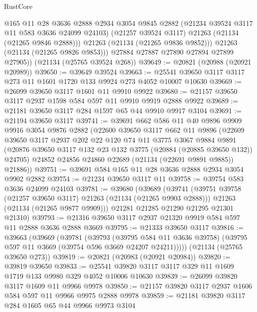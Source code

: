 \begin{lexlean}{RustCore}
\begin{coremodule}
              @165
              @11
              @28
              @3636
              @2888
              @2934
              @3054
              @9845
              @2882
              (@21234 @39524 @3117 @11 @583 @3636 @24099 @24103)
              (@21257 @39524 @3117)
              @21263
              (@21134 (@21265 @9846 @2888)))
            @21263
            (@21134 (@21265 @9836 @9852)))
          @21263
          (@21134 (@21265 @9826 @9853)))
        @27884
        @27887
        @27890
        @27894
        @27899
        @27905))
    (@21134 (@25765 @39524 @268))
@39649 := @20821 (@20988 (@20921 @20989))
@39650 := @39649 @39524
@39663 := @25541 @39650 @3117 @3117 @273 @11 @1601 @1720 @133 @9924 @273 @4052 @10007 @10630
@39669 := @26099 @39650 @3117 @1601 @11 @9910 @9922
@39680 := @21157 @39650 @3117 @2937 @1598 @584 @597 @11 @9910 @9919 @2888 @9922
@39689 := @21181 @39650 @3117 @284 @1597 @65 @44 @9910 @9917 @3104
@39691 := @21194 @39650 @3117
@39741 := @39691
    @662
    @586
    @11
    @40
    @9896
    @9909
    @9916
    @3054
    @9876
    @2882
    (@22600
      @39650
      @3117
      @662
      @11
      @9896
      (@22609
        @39650
        @3117
        @2937
        @202
        @22
        @120
        @74
        @11
        @3775
        @3067
        @9884
        @9891
        (@20876 @39650 @3117 @132 @23 @132 @3775 (@20884 (@20885 @39650 @132)) @24705)
        @24852
        @24856
        @24860
        @22689
        (@21134 (@22691 @9891 @9885))
        @21886))
@39751 := @39691 @584 @165 @11 @28 @3636 @2888 @2934 @3054 @9902 @2882
@39754 := @21234 @39650 @3117 @11
@39758 := @39754 @583 @3636 @24099 @24103
@39781 := @39680
    (@39689
      (@39741
        (@39751 @39758 (@21257 @39650 @3117) @21263 (@21134 (@21265 @9903 @2888)))
        @21263
        (@21134 (@21265 @9877 @9909)))
      @21281
      @21285
      @21290
      @21295
      @21301
      @21310)
@39793 := @21316 @39650 @3117 @2937 @21320 @9919 @584 @597 @11 @2888 @3636 @2888 @3669
@39795 := @21333 @39650 @3117
@39816 := @39663
    (@39669
      (@39781
        (@39793
          (@39795 @584 @11 @3636 @39758)
          (@39795 @597 @11 @3669 (@39754 @596 @3669 @24207 @24211)))))
    (@21134 (@25765 @39650 @273))
@39819 := @20821 (@20983 (@20921 @20984))
@39820 := @39819 @39650
@39833 := @25541 @39820 @3117 @3117 @329 @11 @1609 @1719 @133 @9980 @329 @4052 @10006 @10630
@39839 := @26099 @39820 @3117 @1609 @11 @9966 @9978
@39850 := @21157 @39820 @3117 @2937 @1606 @584 @597 @11 @9966 @9975 @2888 @9978
@39859 := @21181 @39820 @3117 @284 @1605 @65 @44 @9966 @9973 @3104

\end{coremodule}
\end{lexlean}
